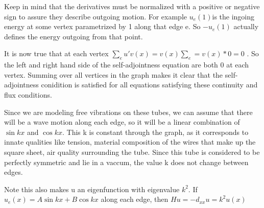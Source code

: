 \documentclass[12pt]{article}
\begin{document}
Keep in mind that the derivatives must be normalized with a positive or negative sign to assure they describe outgoing motion. For example $u_e(1) $is the ingoing energy at some vertex parametrized by 1 along that edge e. So $-u_e(1)$ actually defines the energy outgoing from that point.

It is now true that at each vertex $\sum\nolimits_{e} u'v(x)  = v(x)\sum\nolimits_{e} = v(x)*0 = 0 $ . So the left and right hand side of the self-adjointness equation are both 0 at each vertex. Summing over all vertices in the graph makes it clear that the self-adjointness conidition is satisfied for all equations satisfying these continuity and flux conditions. 

Since we are modeling free vibrations on these tubes, we can assume that there will be a wave motion along each edge, so it will be a linear combination of $ \sin{kx} $ and 
$ \cos{kx} $. This k is constant through the graph, as it corresponds to innate qualities like tension, material composition of the wires that make up the square sheet, air quality surrounding the tube. Since this tube is considered to be perfectly symmetric and lie in a vaccum, the value k does not change between edges.

Note this also makes u an eigenfunction with eigenvalue $k^2$. If $u_e(x) = A \sin{kx}+ B \cos{kx}$ along each edge, then $Hu = -d_{xx} u = k^2 u(x)$

\centerline{}
\end{document}
